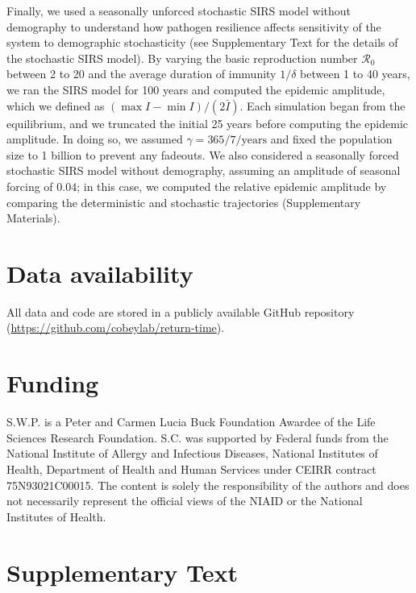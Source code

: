 \documentclass[12pt]{article}
\begin{document}
Finally, we used a seasonally unforced stochastic SIRS model without demography to understand how pathogen resilience affects sensitivity of the system to demographic stochasticity (see Supplementary Text for the details of the stochastic SIRS model).
By varying the basic reproduction number $\mathcal R_0$ between 2 to 20 and the average duration of immunity $1/\delta$ between 1 to 40 years, we ran the SIRS model for 100 years and computed the epidemic amplitude, which we defined as  $(\max I - \min I)/(2 \bar{I})$.
Each simulation began from the equilibrium, and we truncated the initial 25 years before computing the epidemic amplitude.
In doing so, we assumed $\gamma=365/7/\mathrm{years}$ and fixed the population size to 1 billion to prevent any fadeouts.
We also considered a seasonally forced stochastic SIRS model without demography, assuming an amplitude of seasonal forcing of $0.04$;
in this case, we computed the relative epidemic amplitude by comparing the deterministic and stochastic trajectories (Supplementary Materials).

\section*{Data availability}

All data and code are stored in a publicly available GitHub repository (\url{https://github.com/cobeylab/return-time}).

\section*{Funding}

S.W.P. is a Peter and Carmen Lucia Buck Foundation Awardee of the Life Sciences Research Foundation. 
S.C. was supported by Federal funds from the National Institute of Allergy and Infectious Diseases, National Institutes of Health, Department of Health and Human Services under CEIRR contract 75N93021C00015. The content is solely the responsibility of the authors and does not necessarily represent the official views of the NIAID or the National Institutes of Health. 

\pagebreak

\setcounter{figure}{0}
\setcounter{equation}{0}
\renewcommand{\thefigure}{S\arabic{figure}}
\renewcommand{\theequation}{S\arabic{equation}}

\section*{Supplementary Text}
\end{document}
